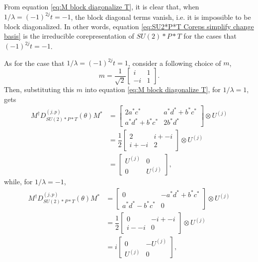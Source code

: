 \documentclass[preprint, 12pt]{revtex4-2}
\numberwithin{equation}{section}
\begin{document}
From equation \ref{eq:M block diagonalize T}, it is clear that, when $1/\lambda=(-1)^{2j}t=-1$, the block diagonal terms vanish, i.e. it is impossible to be block diagonalized. In other words, equation \ref{eq:SU2*P*T Coreps simplify change basis} is the irreducible corepresentation of $SU(2)\ast P\ast T$ for the cases that $(-1)^{2j}t=-1$.

As for the case that $1/\lambda=(-1)^{2j}t=1$, consider a following choice of $m$,
\begin{equation}\label{eq:m lambda one}
    m = \dfrac{1}{\sqrt{2}}\begin{bmatrix}
        i & 1 \\
        -i & 1
    \end{bmatrix}.
\end{equation}
Then, substituting this $m$ into equation \ref{eq:M block diagonalize T}, for $1/\lambda=1$, gets
\begin{equation}\label{eq:M block diagonalized T}
    \begin{aligned}
        M^\dagger D_{SU(2)\ast P\ast T}^{(j,p)}(\theta)M^\ast &= \begin{bmatrix}2a^\ast c^\ast & a^\ast d^\ast + b^\ast c^\ast \\ a^\ast d^\ast + b^\ast c^\ast & 2b^\ast d^\ast\end{bmatrix} \otimes U^{(j)} \\
        &= \dfrac{1}{2}\begin{bmatrix}2 & i + -i \\ i + -i & 2\end{bmatrix} \otimes U^{(j)} \\
        &= \begin{bmatrix}U^{(j)} & 0 \\ 0 & U^{(j)}\end{bmatrix},
    \end{aligned}
\end{equation}
while, for $1/\lambda=-1$,
\begin{equation}\label{eq:M cannot block diagonalized T}
    \begin{aligned}
        M^\dagger D_{SU(2)\ast P\ast T}^{(j,p)}(\theta)M^\ast &= \begin{bmatrix}0 & -a^\ast d^\ast + b^\ast c^\ast \\ a^\ast d^\ast - b^\ast c^\ast & 0\end{bmatrix} \otimes U^{(j)} \\
        &= \dfrac{1}{2}\begin{bmatrix}0 & -i + -i \\ i - -i & 0\end{bmatrix} \otimes U^{(j)} \\
        &= i\begin{bmatrix}0 & -U^{(j)} \\ U^{(j)} & 0\end{bmatrix},
    \end{aligned}
\end{equation}
\end{document}
